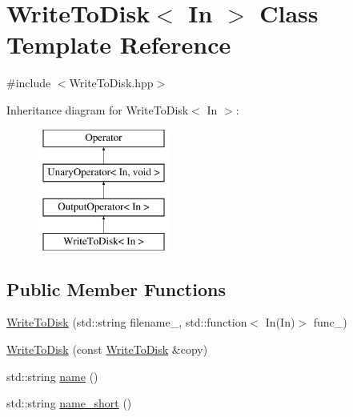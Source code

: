 \hypertarget{class_write_to_disk}{\section{\-Write\-To\-Disk$<$ \-In $>$ \-Class \-Template \-Reference}
\label{class_write_to_disk}
}


{\ttfamily \#include $<$\-Write\-To\-Disk.\-hpp$>$}

\-Inheritance diagram for \-Write\-To\-Disk$<$ \-In $>$\-:\begin{figure}[H]
\begin{center}
\leavevmode
\includegraphics[height=4.000000cm]{class_write_to_disk}
\end{center}
\end{figure}
\subsection*{\-Public \-Member \-Functions}
\begin{DoxyCompactItemize}
\item 
\hyperlink{class_write_to_disk_a6e9f5e442343ed8ab0af76f7884c13f1}{\-Write\-To\-Disk} (std\-::string filename\-\_\-, std\-::function$<$ \-In(\-In)$>$ func\-\_\-)
\item 
\hyperlink{class_write_to_disk_abbdea3010854bb53dfef3f5c006fc245}{\-Write\-To\-Disk} (const \hyperlink{class_write_to_disk}{\-Write\-To\-Disk} \&copy)
\item 
std\-::string \hyperlink{class_write_to_disk_a3b57dac20171d5e166210183bceedea2}{name} ()
\item 
std\-::string \hyperlink{class_write_to_disk_ab7f18e8983197d9917d2d045943b00ca}{name\-\_\-short} ()
\end{DoxyCompactItemize}
